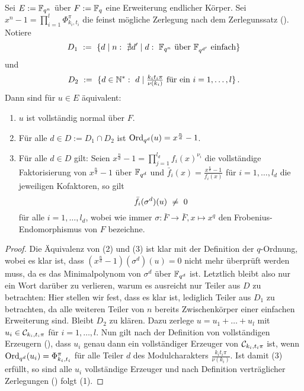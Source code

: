 \begin{lemma}
  Sei $E := \mathbb{F}_{q^n}$ über $F := \mathbb{F}_q$ eine Erweiterung endlicher Körper.
  Sei $x^n-1 = \prod_{i=1}^l \Phi_{k_i,t_i}^\pi$
  die feinst mögliche Zerlegung nach 
  dem Zerlegunssatz ().
  Notiere
  \[ D_1 \speq{:=} \{ d\mid n:\ 
    \nexists d'\mid d:\ \F_{q^n} \text{ über } \F_{q^{d'}}
    \text{ einfach} \}\]
  und 
  \[ D_2 \ :=\  \{ d\in \mathbb{N}^\ast:\ d \mid \tfrac{k_it_i\pi}{\nu(k_i)}
    \text{ für ein } i=1,\ldots,l\}\,.\]
  Dann sind für $u\in E$ äquivalent:
  \begin{enumerate}
    \item $u$ ist vollständig normal über $F$.
    \item Für alle $d \in D := D_1 \cap D_2$ ist
      $\operatorname{Ord}_{q^d}(u) = x^{\frac n d}-1$.
    \item Für alle $d\in D$ gilt:
      Seien $x^{\frac n d}-1 = \prod_{j=1}^{l_d} f_i(x)^{\nu_i}$ 
      die vollständige Faktorisierung  von $x^{\frac n d}-1$ 
      über $\mathbb{F}_{q^d}$ und 
      $\bar f_i(x) = \tfrac{x^{\frac n d}-1}{f_i(x)}$ 
      für $i=1,\ldots,l_d$ die jeweiligen
      Kofaktoren, so gilt
      \[ \bar f_i(\sigma^d)(u) \ \neq\  0 \]
      für alle $i=1,\ldots,l_d$, wobei wie immer 
      $\sigma: \bar F \to \bar F, x\mapsto x^q$ den Frobenius-Endomorphismus
      von $F$ bezeichne.
  \end{enumerate}
\end{lemma}
\begin{proof}
  Die Äquivalenz von (2) und (3) ist klar mit der Definition der $q$-Ordnung,
  wobei es klar ist, dass $(x^{\frac n d}-1)(\sigma^d)(u) = 0$ nicht mehr
  überprüft werden muss, da es das Minimalpolynom von $\sigma^d$ über 
  $\mathbb{F}_{q^d}$ ist.
  Letztlich bleibt also nur ein Wort darüber zu verlieren, warum es ausreicht
  nur Teiler aus $D$ zu betrachten: Hier stellen wir fest, dass es klar ist,
  lediglich Teiler aus $D_1$ zu betrachten, da alle weiteren Teiler von $n$
  bereits Zwischenkörper einer einfachen Erweiterung sind.
  Bleibt $D_2$ zu klären. Dazu zerlege $u = u_1+\ldots+u_l$ mit
  $u_i \in \mathcal{C}_{k_i,t_i\pi}$ für $i=1,\ldots,l$. Nun gilt
  nach der Definition von vollständigen Erzeugern
  (), dass
  $u_i$ genau dann ein vollständiger Erzeuger von $\mathcal{C}_{k_i,t_i\pi}$ ist,
  wenn $\operatorname{Ord}_{q^d}(u_i) = \Phi_{k_i,t_i}^\pi$ für alle
  Teiler $d$ des Modulcharakters $\frac{k_it_i\pi}{\nu(k_i)}$.
  Ist damit (3) erfüllt, so sind alle $u_i$ vollständige Erzeuger und nach
  Definition verträglicher Zerlegungen (\thref{def:vertraeglich}) folgt
  (1).
\end{proof}


